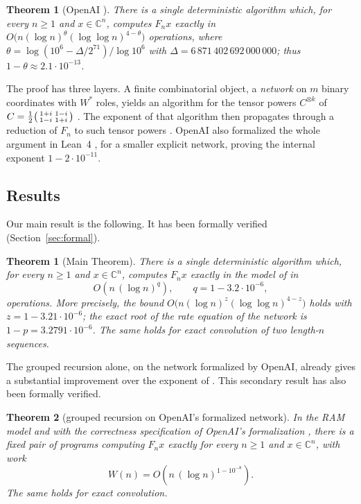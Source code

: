\documentclass[11pt]{article}
\newtheorem{theorem}{Theorem}[section]
\newtheorem*{citedtheorem}{Theorem}
\theoremstyle{definition}
\theoremstyle{remark}
\newcommand{\C}{\mathbb{C}}
\begin{document}
\begin{citedtheorem}[{OpenAI \cite[Theorem~1.1]{oai}}]
There is a single deterministic algorithm which, for every $n\ge1$ and $x\in\C^n$, computes $F_nx$
exactly in $O\big(n(\log n)^\theta(\log\log n)^{4-\theta}\big)$ operations, where
$\theta=\log(10^6-\Delta/2^{71})/\log 10^6$ with $\Delta=6\,871\,402\,692\,000\,000$; thus
$1-\theta\approx2.1\cdot10^{-13}$.
\end{citedtheorem}

The proof has three layers. A finite combinatorial object, a \emph{network} on $m$ binary coordinates
with $W^*$ roles, yields an algorithm for the tensor powers $C^{\otimes k}$ of
$C=\frac12\begin{psmallmatrix}1+i&1-i\\1-i&1+i\end{psmallmatrix}$ \cite[Theorem~2.6]{oai}. The
exponent of that algorithm then propagates through a reduction of $F_n$ to such tensor powers
\cite[Sections~3--5]{oai}. OpenAI also formalized the whole argument in Lean~4 \cite{oailean}, for a
smaller explicit network, proving the internal exponent $1-2\cdot10^{-11}$.

\subsection{Results}
Our main result is the following. It has been formally verified (Section~\ref{sec:formal}).

\begin{theorem}[Main Theorem]\label{thm:main}
There is a single deterministic algorithm which, for every $n\ge1$ and $x\in\C^n$, computes $F_nx$
exactly in the model of \cite{oai} in
\[
  O\!\left(n\,(\log n)^{q}\right),\qquad q=1-3.2\cdot10^{-6},
\]
operations. More precisely, the bound $O\big(n(\log n)^{z}(\log\log n)^{4-z}\big)$ holds with
$z=1-3.21\cdot10^{-6}$; the exact root of the rate equation of the network is
$1-p=3.2791\cdot10^{-6}$. The same holds for exact convolution of two length-$n$ sequences.
\end{theorem}

The grouped recursion alone, on the network formalized by OpenAI, already gives a substantial
improvement over the exponent of \cite{oailean}. This secondary result has also been formally
verified.

\begin{theorem}[grouped recursion on OpenAI's formalized network]\label{thm:formal}
In the RAM model and with the correctness specification of OpenAI's formalization \cite{oailean},
there is a fixed pair of programs computing $F_nx$ exactly for every $n\ge1$ and $x\in\C^n$, with work
\[
  W(n)=O\!\left(n\,(\log n)^{1-10^{-8}}\right).
\]
The same holds for exact convolution.
\end{theorem}
\end{document}
